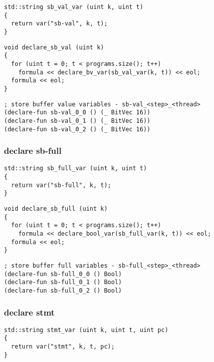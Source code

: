 \begin{lstlisting}[style=c++]
std::string sb_val_var (uint k, uint t)
{
  return var("sb-val", k, t);
}
\end{lstlisting}

\begin{lstlisting}[style=c++]
void declare_sb_val (uint k)
{
  for (uint t = 0; t < programs.size(); t++)
    formula << declare_bv_var(sb_val_var(k, t)) << eol;
  formula << eol;
}
\end{lstlisting}

\begin{lstlisting}[language=SMTLib]
; store buffer value variables - sb-val_<step>_<thread>
(declare-fun sb-val_0_0 () (_ BitVec 16))
(declare-fun sb-val_0_1 () (_ BitVec 16))
(declare-fun sb-val_0_2 () (_ BitVec 16))
\end{lstlisting}

\subsubsection{declare sb-full}

\begin{lstlisting}[style=c++]
std::string sb_full_var (uint k, uint t)
{
  return var("sb-full", k, t);
}
\end{lstlisting}

\begin{lstlisting}[style=c++]
void declare_sb_full (uint k)
{
  for (uint t = 0; t < programs.size(); t++)
    formula << declare_bool_var(sb_full_var(k, t)) << eol;
  formula << eol;
}
\end{lstlisting}

\begin{lstlisting}[language=SMTLib]
; store buffer full variables - sb-full_<step>_<thread>
(declare-fun sb-full_0_0 () Bool)
(declare-fun sb-full_0_1 () Bool)
(declare-fun sb-full_0_2 () Bool)
\end{lstlisting}

\subsubsection{declare stmt}

\begin{lstlisting}[style=c++]
std::string stmt_var (uint k, uint t, uint pc)
{
  return var("stmt", k, t, pc);
}
\end{lstlisting}

